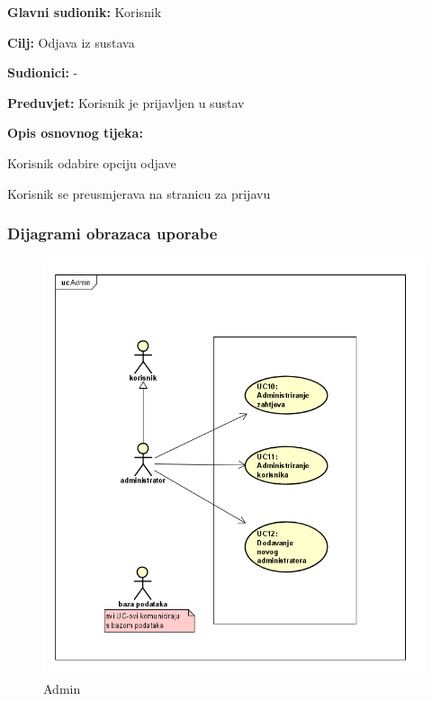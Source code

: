 					\noindent {}
					\begin{packed_item}
						
						\item \textbf{Glavni sudionik: }Korisnik
						\item  \textbf{Cilj:} Odjava iz sustava 
						\item  \textbf{Sudionici:} -
						\item  \textbf{Preduvjet:} Korisnik je prijavljen u sustav
						\item  \textbf{Opis osnovnog tijeka:}
						
						\item[] \begin{packed_enum}
							
							\item Korisnik odabire opciju odjave
							\item Korisnik se preusmjerava na stranicu za prijavu
						\end{packed_enum}
						
					\end{packed_item}
					
					\newpage
			
					
					
				\subsubsection{Dijagrami obrazaca uporabe}
					
					\begin{figure}[H]
					\includegraphics[scale=1.0]{slike/admin.png} %
					\centering
					\caption{Admin}
				\end{figure}
				
